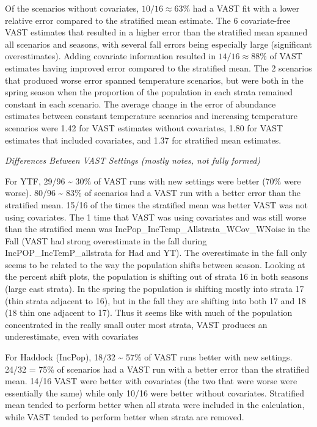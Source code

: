 \documentclass[
  12pt,
]{article}
\begin{document}
Of the scenarios without covariates, \(10/16\approx63\)\% had a VAST fit with a lower relative error compared to the stratified mean estimate. The 6 covariate-free VAST estimates that resulted in a higher error than the stratified mean spanned all scenarios and seasons, with several fall errors being especially large (significant overestimates). Adding covariate information resulted in \(14/16\approx88\)\% of VAST estimates having improved error compared to the stratified mean. The 2 scenarios that produced worse error spanned temperature scenarios, but were both in the spring season when the proportion of the population in each strata remained constant in each scenario. The average change in the error of abundance estimates between constant temperature scenarios and increasing temperature scenarios were 1.42 for VAST estimates without covariates, 1.80 for VAST estimates that included covariates, and 1.37 for stratified mean estimates.

\emph{Differences Between VAST Settings (mostly notes, not fully formed)}

For YTF, 29/96 \textasciitilde{} 30\% of VAST runs with new settings were better (70\% were worse). 80/96 \textasciitilde{} 83\% of scenarios had a VAST run with a better error than the stratified mean. 15/16 of the times the stratified mean was better VAST was not using covariates. The 1 time that VAST was using covariates and was still worse than the stratified mean was IncPop\_IncTemp\_Allstrata\_WCov\_WNoise in the Fall (VAST had strong overestimate in the fall during IncPOP\_IncTemP\_allstrata for Had and YT). The overestimate in the fall only seems to be related to the way the population shifts between season. Looking at the percent shift plots, the population is shifting out of strata 16 in both seasons (large east strata). In the spring the population is shifting mostly into strata 17 (thin strata adjacent to 16), but in the fall they are shifting into both 17 and 18 (18 thin one adjacent to 17). Thus it seems like with much of the population concentrated in the really small outer most strata, VAST produces an underestimate, even with covariates

For Haddock (IncPop), 18/32 \textasciitilde{} 57\% of VAST runs better with new settings. 24/32 = 75\% of scenarios had a VAST run with a better error than the stratified mean. 14/16 VAST were better with covariates (the two that were worse were essentially the same) while only 10/16 were better without covariates. Stratified mean tended to perform better when all strata were included in the calculation, while VAST tended to perform better when strata are removed.
\end{document}
